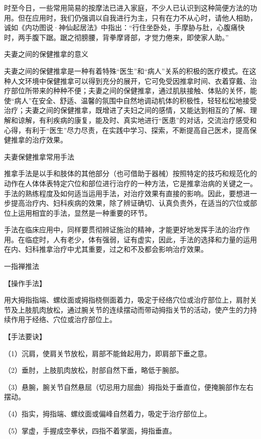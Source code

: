 \documentclass[12pt,UTF8,openany]{ctexbook}
\begin{document}
时至今日，一些常用简易的按摩法已进入家庭，不少人已认识到这种简便方法的功用。但在应用时，我们仍强调以自我进行为主，只有在力不从心时，请他人相助，诚如《内功图说·神仙起居法》中指出：“行住坐卧处，手摩胁与肚，心腹痛快时，两手腹下踞。踞之彻膀腰，背拳摩肾部，才觉力倦来，即使家人助。”





夫妻之间的保健推拿的意义


夫妻之间的保健推拿是一种有着特殊“医生”和“病人”关系的积极的医疗模式。在这种人文环境中保健推拿可以得到充分的展开，它可免受因推拿时间、衣着穿戴、治疗部位所带来的种种不便；夫妻之间的保健推拿，通过肌肤接触、体贴的关怀，能使“病人”在安全、舒适、温馨的氛围中自然地调动机体的积极性，轻轻松松地接受治疗；夫妻之间的保健推拿，既增进了夫妇之间的感情，又能达到相互的了解、理解和谅解，有利疾病的康复，能及时、真实地进行“医患”的对话，交流治疗感受和心得，有利于“医生”尽力尽责，在实践中学习、探索，不断提高自己医术，提高保健推拿的治疗效果。





夫妻保健推拿常用手法


推拿手法是以手和肢体的其他部分（也可借助于器械）按照特定的技巧和规范化的动作在人体体表特定穴位和部位进行治疗的一种方法，它是推拿治病的关键之一。手法的熟练程度及如何适当运用手法，对治疗效果有直接的影响。因此，要想进一步提高治疗内、妇科疾病的效果，除了辨证确切、认真负责外，在适当的穴位或部位上运用相宜的手法，显然是一种重要的环节。

手法在临床应用中，同样要贯彻辨证施治的精神，才能更好地发挥手法的治疗作用。在临症时，人有老少，体有强弱，证有虚实，因此，手法的选择和力量的运用在内、妇科推拿治疗中尤其重要，过之和不及都会影响治疗效果。

一指禅推法

【操作手法】

用大拇指指端、螺纹面或拇指桡侧面着力，吸定于经络穴位或治疗部位上，肩肘关节及上肢肌肉放松，通过腕关节的连续摆动而带动拇指关节的活动，使产生的力持续作用于经络、穴位或治疗部位上。

【手法要诀】

（1）沉肩，使肩关节放松，肩部不能耸起用力，即肩部下垂之意。

（2）垂肘，上肢肌肉放松，肘部自然下垂，略低于腕部。

（3）悬腕，腕关节自然悬屈（切忌用力屈曲）拇指处于垂直位，便掩腕部作左右摆动。

（4）指实，拇指端、螺纹面或偏峰自然着力，吸定于治疗部位上。

（5）掌虚，手握成空拳状，四指不着掌面，拇指垂直。
\end{document}
